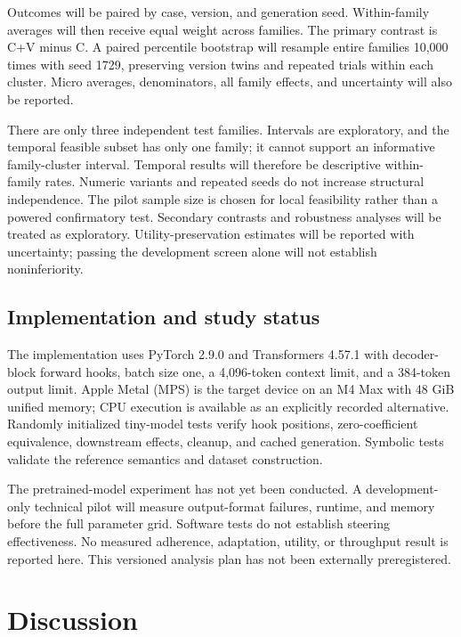 \documentclass[preprint,12pt,numbers,nopreprintline]{elsarticle}
\begin{document}
Outcomes will be paired by case, version, and generation seed. Within-family averages will then receive equal weight across families. The primary contrast is C+V minus C. A paired percentile bootstrap will resample entire families 10,000 times with seed 1729, preserving version twins and repeated trials within each cluster. Micro averages, denominators, all family effects, and uncertainty will also be reported.

There are only three independent test families. Intervals are exploratory, and the temporal feasible subset has only one family; it cannot support an informative family-cluster interval. Temporal results will therefore be descriptive within-family rates. Numeric variants and repeated seeds do not increase structural independence. The pilot sample size is chosen for local feasibility rather than a powered confirmatory test. Secondary contrasts and robustness analyses will be treated as exploratory. Utility-preservation estimates will be reported with uncertainty; passing the development screen alone will not establish noninferiority.

\subsection{Implementation and study status}

The implementation uses PyTorch 2.9.0 and Transformers 4.57.1 with decoder-block forward hooks, batch size one, a 4,096-token context limit, and a 384-token output limit. Apple Metal (MPS) is the target device on an M4 Max with 48 GiB unified memory; CPU execution is available as an explicitly recorded alternative. Randomly initialized tiny-model tests verify hook positions, zero-coefficient equivalence, downstream effects, cleanup, and cached generation. Symbolic tests validate the reference semantics and dataset construction.

The pretrained-model experiment has not yet been conducted. A development-only technical pilot will measure output-format failures, runtime, and memory before the full parameter grid. Software tests do not establish steering effectiveness. No measured adherence, adaptation, utility, or throughput result is reported here. This versioned analysis plan has not been externally preregistered.

\section{Discussion}
\end{document}
